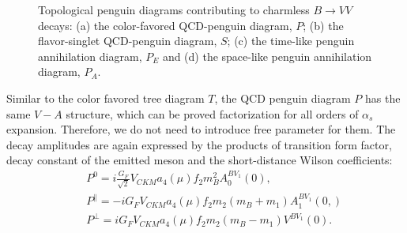 \documentclass[11pt]{article}
\begin{document}
  \begin{figure}%
  \begin{center}
  \caption{Topological penguin diagrams contributing to
     charmless  $B\to VV$ decays:
  (a) the color-favored  QCD-penguin diagram, $P$;
  (b) the flavor-singlet   QCD-penguin diagram, $S$;
  (c) the time-like  penguin annihilation diagram, $P_E$ and
  (d) the    space-like penguin annihilation diagram, $P_A$.}
 \label{Penguindiagram}
  \end{center}
  \end{figure}


Similar to the color favored tree diagram $T$,  the QCD penguin diagram $P$ has the same $V-A$ structure, which can be proved factorization for all orders of $\alpha_s$ expansion. Therefore, we do not need to introduce free parameter for them. The decay amplitudes are again expressed by the products of transition form factor, decay constant of the emitted meson and the short-distance  Wilson coefficients:
 \begin{eqnarray}
&&{ P}^0=i\frac{G_F}{\sqrt 2}V_{CKM}a_4(\mu)f_2m_B^2A_0^{BV_1}(0), \\
&&{ P}^\parallel=-iG_FV_{CKM}a_4(\mu)f_2m_2 \left(m_B+m_1\right) A_1^{BV_1}(0,) \\
&&{ P}^\perp=iG_FV_{CKM}a_4(\mu)f_2m_2\left(m_B-m_1\right)V^{BV_1}(0).
\end{eqnarray}
\end{document}
